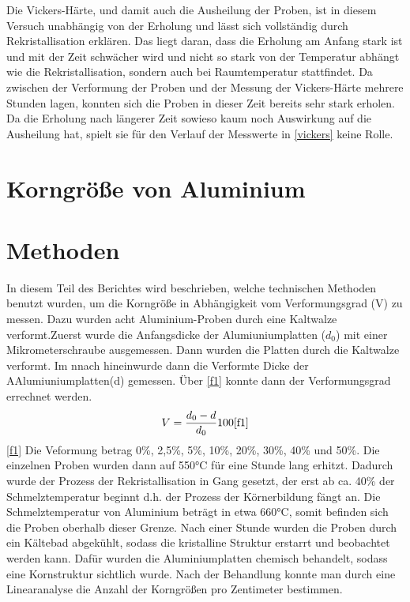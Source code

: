 \documentclass[
	a4paper,
	12pt,
	pagesize,
	ngerman
]{scrartcl}
\begin{document}
Die Vickers-Härte, und damit auch die Ausheilung der Proben, ist in diesem Versuch unabhängig von der Erholung und lässt sich vollständig durch Rekristallisation erklären. Das liegt daran, dass die Erholung am Anfang stark ist und mit der Zeit schwächer wird und nicht so stark von der Temperatur abhängt wie die Rekristallisation, sondern auch bei Raumtemperatur stattfindet. Da zwischen der Verformung der Proben und der Messung der Vickers-Härte mehrere Stunden lagen, konnten sich die Proben in dieser Zeit bereits sehr stark erholen. Da die Erholung nach längerer Zeit sowieso kaum noch Auswirkung auf die Ausheilung hat, spielt sie für den Verlauf der Messwerte in \cref{vickers} keine Rolle.

\section{Korngröße von Aluminium}
\section{Methoden}
In diesem Teil des Berichtes wird beschrieben, welche technischen Methoden benutzt wurden, um die Korngröße in Abhängigkeit vom Verformungsgrad (V) zu messen. Dazu wurden acht Aluminium-Proben durch eine Kaltwalze verformt.Zuerst wurde die Anfangsdicke der Alumiuniumplatten ($d_0$) mit einer Mikrometerschraube ausgemessen. Dann wurden die Platten durch die Kaltwalze verformt. Im nnach hineinwurde dann die Verformte Dicke der AAlumiuniumplatten(d) gemessen. Über \cref{f1} konnte dann der Verformungsgrad errechnet werden.
 \begin{align}
    V = \frac{d_0-d}{d_0}100 \cref{f1}
\end{align} \cref{f1}
Die Veformung betrag 0\%, 2,5\%, 5\%, 10\%, 20\%, 30\%, 40\% und 50\%.
Die einzelnen Proben wurden dann auf 550°C für eine Stunde lang erhitzt. Dadurch wurde der Prozess der Rekristallisation in Gang gesetzt, der erst ab ca. 40\% der Schmelztemperatur beginnt d.h. der Prozess der Körnerbildung fängt an. Die Schmelztemperatur von Aluminium beträgt in etwa 660°C, somit befinden sich die Proben oberhalb dieser Grenze. Nach einer Stunde wurden die Proben durch ein Kältebad abgekühlt, sodass die kristalline Struktur erstarrt und beobachtet werden kann. Dafür wurden die Aluminiumplatten chemisch behandelt, sodass eine Kornstruktur sichtlich wurde. Nach der Behandlung konnte man durch eine Linearanalyse die Anzahl der Korngrößen pro Zentimeter bestimmen.
\end{document}
